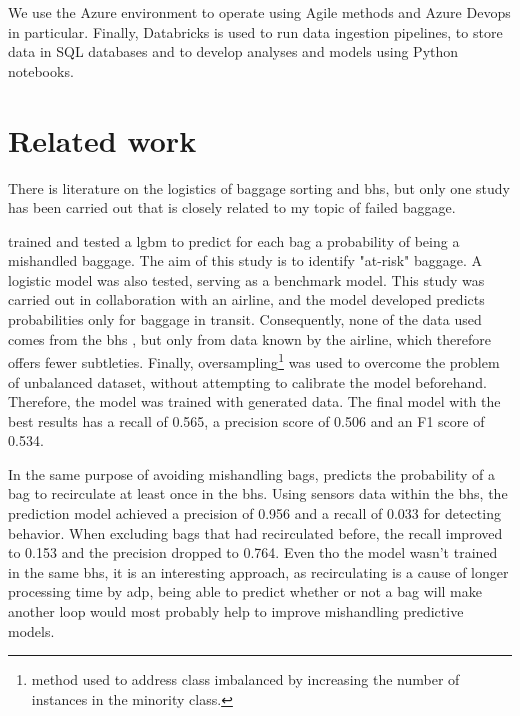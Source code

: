 \documentclass[12pt]{article}
\begin{document}
We use the Azure environment to operate using Agile methods and Azure Devops in particular. Finally, Databricks is used to run data ingestion pipelines, to store data in SQL databases and to develop analyses and models using Python notebooks.


\section{Related work}

There is literature on the logistics of baggage sorting and \acrlong{bhs}, but only one study has been carried out that is closely related to my topic of failed baggage. \hfill \break

\cite{MishandledBgas} trained and tested a \acrlong{lgbm} to predict for each bag a probability of being a mishandled baggage. The aim of this study is to identify "at-risk" baggage. A logistic model was also tested, serving as a benchmark model. \hfill \break 
\noindent This study was carried out in collaboration with an airline, and the model developed predicts probabilities only for baggage in transit. Consequently, none of the data used comes from the \acrshort{bhs} , but only from data known by the airline, which therefore offers fewer subtleties. Finally, oversampling\footnote{method used to address class imbalanced by increasing the number of instances in the minority class.} was used to overcome the problem of unbalanced dataset, without attempting to calibrate the model beforehand. Therefore, the model was trained with generated data. \hfill \break
\noindent The final model with the best results has a recall of 0.565, a precision score of 0.506 and an F1 score of 0.534. \hfill \break

In the same purpose of avoiding mishandling bags, \cite{ForecastingFramework} predicts the probability of a bag to recirculate at least once in the \acrlong{bhs}. Using sensors data within the \acrshort{bhs}, the prediction model achieved a precision of 0.956 and a recall of 0.033 for detecting behavior. When excluding bags that had recirculated before, the recall improved to 0.153 and the precision dropped to 0.764. Even tho the model wasn't trained in the same \acrshort{bhs}, it is an interesting approach, as recirculating is a cause of longer processing time by \acrshort{adp}, being able to predict whether or not a bag will make another loop would most probably help to improve mishandling predictive models. \hfill \break 
\end{document}
